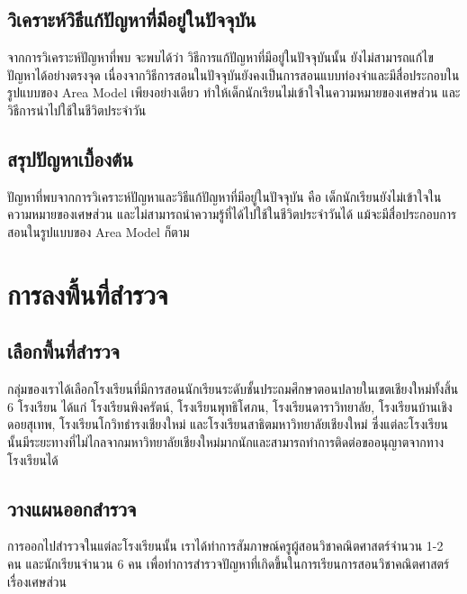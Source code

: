 \subsection{วิเคราะห์วิธีแก้ปัญหาที่มีอยู่ในปัจจุบัน}
จากการวิเคราะห์ปัญหาที่พบ จะพบได้ว่า วิธีการแก้ปัญหาที่มีอยู่ในปัจจุบันนั้น ยังไม่สามารถแก้ไขปัญหาได้อย่างตรงจุด
 เนื่องจากวิธีการสอนในปัจจุบันยังคงเป็นการสอนแบบท่องจำและมีสื่อประกอบในรูปแบบของ Area Model เพียงอย่างเดียว
 ทำให้เด็กนักเรียนไม่เข้าใจในความหมายของเศษส่วน และวิธีการนำไปใช้ในชีวิตประจำวัน
 
\subsection{สรุปปัญหาเบื้องต้น}
ปัญหาที่พบจากการวิเคราะห์ปัญหาและวิธีแก้ปัญหาที่มีอยู่ในปัจจุบัน คือ เด็กนักเรียนยังไม่เข้าใจในความหมายของเศษส่วน
 และไม่สามารถนำความรู้ที่ได้ไปใช้ในชีวิตประจำวันได้ แม้จะมีสื่อประกอบการสอนในรูปแบบของ Area Model ก็ตาม

\section{การลงพื้นที่สำรวจ}

\subsection{เลือกพี้นที่สำรวจ}
กลุ่มของเราได้เลือกโรงเรียนที่มีการสอนนักเรียนระดับชั้นประถมศึกษาตอนปลายในเขตเชียงใหม่ทั้งสิ้น 6 โรงเรียน ได้แก่ โรงเรียนพิงครัตน์, โรงเรียนพุทธิโศภน, โรงเรียนดาราวิทยาลัย, โรงเรียนบ้านเชิงดอยสุเทพ, โรงเรียนโกวิทธำรงเชียงใหม่ และโรงเรียนสาธิตมหาวิทยาลัยเชียงใหม่
 ซึ่งแต่ละโรงเรียนนั้นมีระยะทางที่ไม่ไกลจากมหาวิทยาลัยเชียงใหม่มากนักและสามารถทำการติดต่อขออนุญาตจากทางโรงเรียนได้

\subsection{วางแผนออกสำรวจ}
การออกไปสำรวจในแต่ละโรงเรียนนั้น เราได้ทำการสัมภาษณ์ครูผู้สอนวิชาคณิตศาสตร์จำนวน 1-2 คน และนักเรียนจำนวน 6 คน
 เพื่อทำการสำรวจปัญหาที่เกิดขึ้นในการเรียนการสอนวิชาคณิตศาสตร์เรื่องเศษส่วน